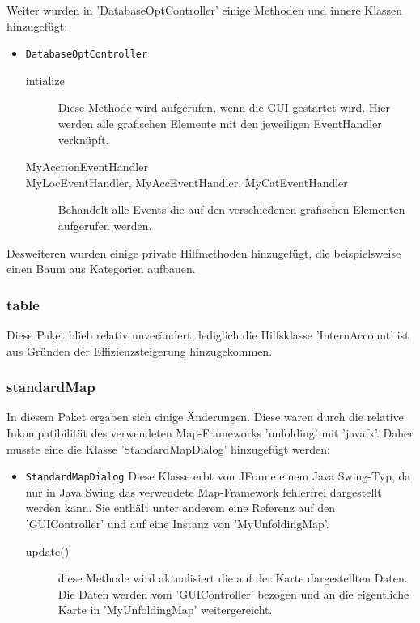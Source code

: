 Weiter wurden in 'DatabaseOptController' einige Methoden und innere Klassen hinzugefügt:
\begin{itemize}
	\item \lstinline{DatabaseOptController}
	\quad
	\begin{description}
		\item[intialize]
		\quad
		Diese Methode wird aufgerufen, wenn die GUI gestartet wird. Hier werden alle grafischen Elemente mit den jeweiligen EventHandler verknüpft.
		\item[MyAcctionEventHandler]
		\item[MyLocEventHandler, MyAccEventHandler, MyCatEventHandler] 
		\quad
		Behandelt alle Events die auf den verschiedenen grafischen Elementen aufgerufen werden.
	\end{description}
\end{itemize}
	
Desweiteren wurden einige private Hilfmethoden hinzugefügt, die beispielsweise einen Baum aus Kategorien aufbauen.

\subsubsection{table}
Diese Paket blieb relativ unverändert, lediglich die Hilfsklasse 'InternAccount' ist aus Gründen der Effizienzsteigerung hinzugekommen.
		
\subsubsection{standardMap}
In diesem Paket ergaben sich einige Änderungen. Diese waren durch die relative Inkompatibilität des verwendeten Map-Frameworks 'unfolding' mit 'javafx'. Daher musste eine die Klasse 'StandardMapDialog' hinzugefügt werden:
\begin{itemize}
	\item \lstinline{StandardMapDialog}
	\quad
	Diese Klasse erbt von JFrame einem Java Swing-Typ, da nur in Java Swing das verwendete Map-Framework fehlerfrei dargestellt werden kann. Sie enthält unter anderem eine Referenz auf den 'GUIController' und auf eine Instanz von 'MyUnfoldingMap'.
	\begin{description}
		\item[update()] diese Methode wird aktualisiert die auf der Karte dargestellten Daten. Die Daten werden vom 'GUIController' bezogen und an die eigentliche Karte in 'MyUnfoldingMap' weitergereicht.
	\end{description}
\end{itemize}
		
